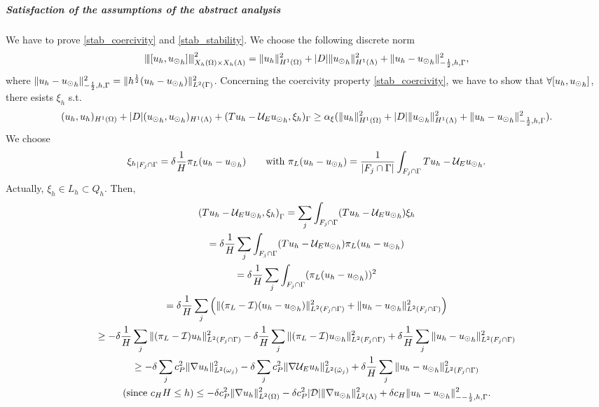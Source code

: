 \subparagraph{Satisfaction of the assumptions of the 
abstract analysis} 
We have to prove \eqref{stab_coercivity} and \eqref{stab_stability}.
We choose the following discrete norm
\begin{equation*}
{\left\vert\kern-0.25ex\left\vert\kern-0.25ex\left\vert [u_h, {u_{\odot}}_h] \right\vert\kern-0.25ex\right\vert\kern-0.25ex\right\vert}^2_{X_h(\Omega)\times X_h(\Lambda) }
= \|u_h\|^2_{H^1(\Omega)}+|D|\|{u_{\odot}}_h\|^2_{H^1(\Lambda)} + \|u_h - {u_{\odot}}_h\|^2_{-\frac 12, h, \Gamma},
\end{equation*}
where $\|u_h - {u_{\odot}}_h\|^2_{-\frac 12, h, \Gamma} = \|h^{\frac 12} (u_h - {u_{\odot}}_h)\|^2_{L^2(\Gamma)} $.
Concerning the coercivity property \eqref{stab_coercivity}, we have to show that $\forall [u_h, {u_{\odot}}_h]$, there esists $\xi_h$ s.t.
\begin{equation*}
(u_h,u_h)_{H^1(\Omega)}+ |D|({u_{\odot}}_h, {u_{\odot}}_h)_{H^1(\Lambda)} +  (Tu_h -  \mathcal{U}_E {u_{\odot}}_h, \xi_h)_{\Gamma} \geq \alpha_{\xi}(\|u_h\|^2_{H^1(\Omega)}+|D|\|{u_{\odot}}_h\|^2_{H^1(\Lambda)}+ \|u_h - {u_{\odot}}_h\|^2_{-\frac 12, h, \Gamma}).
\end{equation*}
We choose 
\begin{equation*}
{\xi_h}_{|F_j\cap \Gamma}=\delta \frac 1H \pi_L(u_h-{u_{\odot}}_h) \qquad \text{with } \pi_L(u_h-{u_{\odot}}_h) =\frac{1}{|F_j\cap \Gamma|}\int_{F_j\cap \Gamma} Tu_h-\mathcal{U}_E {u_{\odot}}_h.
\end{equation*}
Actually, $\xi_h\in L_h \subset Q_h$. Then,
\begin{multline*}
\left( Tu_h - \mathcal{U}_E{u_{\odot}}_h, \xi _h \right)_{\Gamma} 
= \sum_j \int_{F_j\cap \Gamma} ( Tu_h - \mathcal{U}_E{u_{\odot}}_h)\xi_h
\\
= \delta \frac{1}{H} \sum_j \int_{F_j\cap \Gamma} ( Tu_h - \mathcal{U}_E{u_{\odot}}_h) \pi_L(u_h - {u_{\odot}}_h)
\\
=\delta \frac{1}{H} \sum_j \int_{F_j\cap \Gamma}  (\pi_L(u_h - {u_{\odot}}_h))^2
\\
=\delta \frac{1}{H} \sum_j \left(\|(\pi_L - \mathcal{I})(u_h-{u_{\odot}}_h)\|^2_{L^2(F_j\cap \Gamma)}  + \|u_h-{u_{\odot}}_h\|^2_{L^2(F_j\cap \Gamma)} \right)
\\
\geq -\delta \frac 1H \sum_j \|(\pi_L - \mathcal{I})u_h\|^2_{L^2(F_j\cap \Gamma)}
- \delta \frac 1H \sum_j \|(\pi_L - \mathcal{I}){u_{\odot}}_h\|^2_{L^2(F_j\cap \Gamma)} 
+ \delta \frac 1H \sum_j \|u_h-{u_{\odot}}_h\|^2_{L^2(F_j\cap \Gamma)}
\\
\geq -\delta \sum_j c_P^2 \|\nabla u_h\|^2_{L^2(\omega_j)}
- \delta \sum_j c_P^2 \|\nabla  \mathcal{U}_E u_h\|^2_{L^2(\tilde{\omega}_j)}
+ \delta \frac 1H \sum_j \|u_h-{u_{\odot}}_h\|^2_{L^2(F_j\cap \Gamma)}
\\
(\text{since }c_H H \leq h ) \leq -\delta c_P^2 \|\nabla u_h\|^2_{L^2(\Omega)} - \delta c_P^2 |\mathcal{D}|\|\nabla {u_{\odot}}_h\|^2_{L^2(\Lambda)} + \delta c_H \|u_h-{u_{\odot}}_h\|^2_{--\frac 12,h,\Gamma}. 
\end{multline*}
